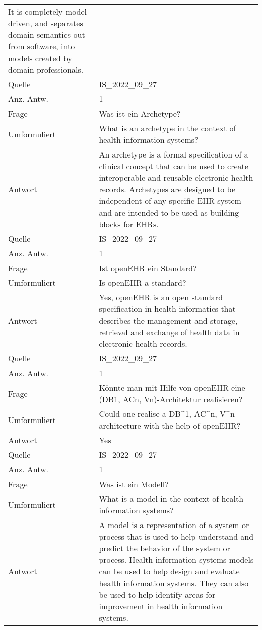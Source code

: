 \begin{landscape}
\begin{longtable}{p{3cm}p{}}
    It is completely model-driven, and separates domain semantics out from software, into models created by domain professionals.\\
    Quelle & IS\_2022\_09\_27 \\
    Anz. Antw.& 1 \\
    \midrule
    Frage & Was ist ein Archetype? \\
    Umformuliert & What is an archetype in the context of health information systems? \\
    Antwort & An archetype is a formal specification of a clinical concept that can be used to create interoperable and reusable electronic health records.
    Archetypes are designed to be independent of any specific EHR system and are intended to be used as building blocks for EHRs.\\
    Quelle & IS\_2022\_09\_27 \\
    Anz. Antw.& 1 \\
    \midrule
    Frage & Ist openEHR ein Standard? \\
    Umformuliert & Is openEHR a standard? \\
    Antwort & Yes, openEHR is an open standard specification in health informatics that describes the management and storage, retrieval and exchange of health data in electronic health records.\\
    Quelle & IS\_2022\_09\_27 \\
    Anz. Antw.& 1 \\
    \midrule
    Frage & Könnte man mit Hilfe von openEHR eine (DB1, ACn, Vn)-Architektur realisieren? \\
    Umformuliert & Could one realise a DB\textasciicircum{}1, AC\textasciicircum{}n, V\textasciicircum{}n architecture with the help of openEHR? \\
    Antwort & Yes \\
    Quelle & IS\_2022\_09\_27 \\
    Anz. Antw.& 1 \\
    \midrule
    Frage & Was ist ein Modell? \\
    Umformuliert & What is a model in the context of health information systems? \\
    Antwort & A model is a representation of a system or process that is used to help understand and predict the behavior of the system or process.
    Health information systems models can be used to help design and evaluate health information systems.
    They can also be used to help identify areas for improvement in health information systems.\\

\end{longtable}
\end{landscape}
